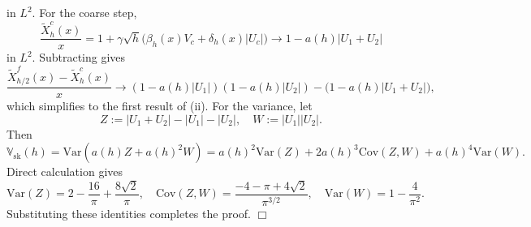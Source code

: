 \documentclass[11pt]{article}
\begin{document}
in $L^2$.  For the coarse step,
\[
\frac{\tilde{X}_h^c(x)}{x}
=
1 + \gamma \sqrt{h}\bigl(\beta_h(x)V_c + \delta_h(x)|U_c|\bigr)
\rightarrow
1 - a(h)|U_1+U_2|
\]
in $L^2$.  Subtracting gives
\[
\frac{\tilde{X}_{h/2}^f(x) - \tilde{X}_h^c(x)}{x}
\rightarrow
(1 - a(h)|U_1|)(1 - a(h)|U_2|) - \bigl(1 - a(h)|U_1+U_2|\bigr),
\]
which simplifies to the first result of (ii). For the variance, let
\[
Z := |U_1+U_2| - |U_1| - |U_2|,
\quad
W := |U_1||U_2|.
\]
Then 
\[
\mathbb{V}_{\mathrm{sk}}(h)
=
\text{Var}(a(h)Z + a(h)^2 W)
=
a(h)^2 \text{Var}(Z) + 2 a(h)^3 \text{Cov}(Z,W) + a(h)^4 \text{Var}(W).
\]
Direct calculation gives
\[
\text{Var}(Z) = 2 - \frac{16}{\pi} + \frac{8\sqrt{2}}{\pi},
\quad
\text{Cov}(Z,W) = \frac{-4 - \pi + 4\sqrt{2}}{\pi^{3/2}},
\quad
\text{Var}(W) = 1 - \frac{4}{\pi^2}.
\]
Substituting these identities completes the proof. $\Box$




%
\end{document}
